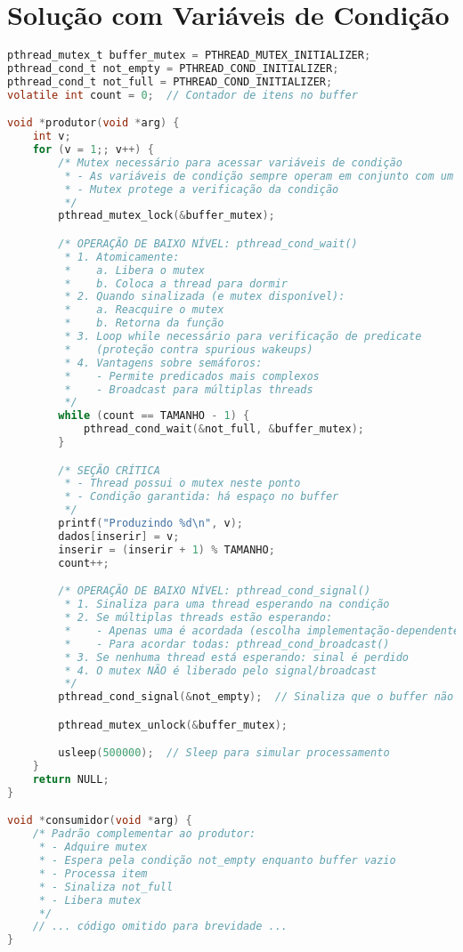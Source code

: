 \documentclass[12pt]{article}
\begin{document}
\section{Solução com Variáveis de Condição}

\begin{lstlisting}[language=C, caption=Implementação com Variáveis de Condição]
pthread_mutex_t buffer_mutex = PTHREAD_MUTEX_INITIALIZER;
pthread_cond_t not_empty = PTHREAD_COND_INITIALIZER;
pthread_cond_t not_full = PTHREAD_COND_INITIALIZER;
volatile int count = 0;  // Contador de itens no buffer

void *produtor(void *arg) {
    int v;
    for (v = 1;; v++) {
        /* Mutex necessário para acessar variáveis de condição
         * - As variáveis de condição sempre operam em conjunto com um mutex
         * - Mutex protege a verificação da condição
         */
        pthread_mutex_lock(&buffer_mutex);

        /* OPERAÇÃO DE BAIXO NÍVEL: pthread_cond_wait()
         * 1. Atomicamente:
         *    a. Libera o mutex
         *    b. Coloca a thread para dormir
         * 2. Quando sinalizada (e mutex disponível):
         *    a. Reacquire o mutex
         *    b. Retorna da função
         * 3. Loop while necessário para verificação de predicate
         *    (proteção contra spurious wakeups)
         * 4. Vantagens sobre semáforos:
         *    - Permite predicados mais complexos
         *    - Broadcast para múltiplas threads
         */
        while (count == TAMANHO - 1) {
            pthread_cond_wait(&not_full, &buffer_mutex);
        }

        /* SEÇÃO CRÍTICA
         * - Thread possui o mutex neste ponto
         * - Condição garantida: há espaço no buffer
         */
        printf("Produzindo %d\n", v);
        dados[inserir] = v;
        inserir = (inserir + 1) % TAMANHO;
        count++;

        /* OPERAÇÃO DE BAIXO NÍVEL: pthread_cond_signal()
         * 1. Sinaliza para uma thread esperando na condição
         * 2. Se múltiplas threads estão esperando:
         *    - Apenas uma é acordada (escolha implementação-dependente)
         *    - Para acordar todas: pthread_cond_broadcast()
         * 3. Se nenhuma thread está esperando: sinal é perdido
         * 4. O mutex NÃO é liberado pelo signal/broadcast
         */
        pthread_cond_signal(&not_empty);  // Sinaliza que o buffer não está mais vazio

        pthread_mutex_unlock(&buffer_mutex);

        usleep(500000);  // Sleep para simular processamento
    }
    return NULL;
}

void *consumidor(void *arg) {
    /* Padrão complementar ao produtor:
     * - Adquire mutex
     * - Espera pela condição not_empty enquanto buffer vazio
     * - Processa item
     * - Sinaliza not_full
     * - Libera mutex
     */
    // ... código omitido para brevidade ...
}
\end{lstlisting}
\end{document}

